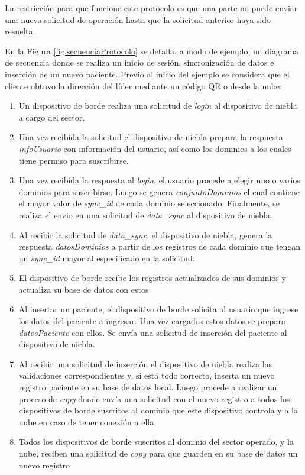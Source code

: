 La restricción para que funcione este protocolo es que una parte no puede enviar una nueva solicitud de operación hasta que la solicitud anterior haya sido resuelta.

En la Figura \ref{fig:secuenciaProtocolo} se detalla, a modo de ejemplo, un diagrama de secuencia donde se realiza un inicio de sesión, sincronización de datos e inserción de un nuevo paciente. Previo al inicio del ejemplo se considera que el cliente obtuvo la dirección del líder mediante un código QR o desde la nube:
\begin{enumerate}
    \item Un dispositivo de borde realiza una solicitud de \textit{login} al dispositivo de niebla a cargo del sector.
    
    \item Una vez recibida la solicitud el dispositivo de niebla prepara la respuesta \textit{infoUsuario} con información del usuario, así como los dominios a los cuales tiene permiso para suscribirse.
    
    \item Una vez recibida la respuesta al \textit{login}, el usuario procede a elegir uno o varios dominios para suscribirse. Luego se genera \textit{conjuntoDominios} el cual contiene el mayor valor de \textit{sync\_id} de cada dominio seleccionado. Finalmente, se realiza el envio en una solicitud de \textit{data\_sync} al dispositivo de niebla.

    \item Al recibir la solicitud de \textit{data\_sync}, el dispositivo de niebla, genera la respuesta \textit{datosDominios} a partir de los registros de cada dominio que tengan un \textit{sync\_id} mayor al especificado en la solicitud.

    \item El dispositivo de borde recibe los registros actualizados de sus dominios y actualiza su base de datos con estos.

    \item Al insertar un paciente, el dispositivo de borde solicita al usuario que ingrese los datos del paciente a ingresar. Una vez cargados estos datos se prepara \textit{datosPaciente} con ellos. Se envía una solicitud de inserción del paciente al dispositivo de niebla.

    \item Al recibir una solicitud de inserción el dispositivo de niebla realiza las validaciones correspondientes y, si está todo correcto, inserta un nuevo registro paciente en su base de datos local. Luego procede a realizar un proceso de \textit{copy} donde envía una solicitud con el nuevo registro a todos los dispositivos de borde suscritos al dominio que este dispositivo controla y a la nube en caso de tener conexión a ella.

    \item Todos los dispositivos de borde suscritos al dominio del sector operado, y la nube, reciben una solicitud de \textit{copy} para que guarden en su base de datos un nuevo registro
\end{enumerate}

